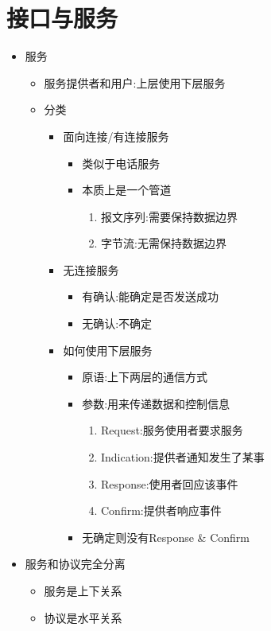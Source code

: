 \documentclass[a4paper,12pt,notitlepage]{article}
\begin{document}
\section{接口与服务}
\begin{itemize}
	\item 服务
	\begin{itemize}
		\item 服务提供者和用户:上层使用下层服务
		\item 分类
		\begin{itemize}
			\item 面向连接/有连接服务
			\begin{itemize}
				\item 类似于电话服务
				\item 本质上是一个管道
				\begin{enumerate}
					\item 报文序列:需要保持数据边界
					\item 字节流:无需保持数据边界
				\end{enumerate}
			\end{itemize}
			\item 无连接服务
			\begin{itemize}
				\item 有确认:能确定是否发送成功
				\item 无确认:不确定
			\end{itemize}
			\item 如何使用下层服务
			\begin{itemize}
				\item 原语:上下两层的通信方式
				\item 参数:用来传递数据和控制信息
				\begin{enumerate}
					\item Request:服务使用者要求服务
					\item Indication:提供者通知发生了某事
					\item Response:使用者回应该事件
					\item Confirm:提供者响应事件
				\end{enumerate}
				\item 无确定则没有Response \& Confirm
			\end{itemize}
		\end{itemize}
	\end{itemize}
	\item 服务和协议完全分离
	\begin{itemize}
		\item 服务是上下关系
		\item 协议是水平关系
	\end{itemize}
\end{itemize}
\end{document}
